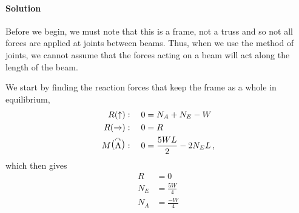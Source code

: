 \documentclass[a4paper,justified,oneside]{tufte-handout}
\numberwithin{equation}{subsection}
\begin{document}
\begin{solution}
\paragraph{Solution}
Before we begin, we must note that this is a frame, not a truss and so not all forces are applied at joints between beams. Thus, when we use the method of joints, we cannot assume that the forces acting on a beam will act along the length of the beam.

We start by finding the reaction forces that keep the frame as a whole in equilibrium,
\begin{align*}
	R(\uparrow):\quad	0	&=	N_A	+N_E	-W	\\
	R(\rightarrow):\quad	0	&=	R	\\
	M\raisebox{1.5pt}{\big(}\overset{\curvearrowright}{\text{A}}\raisebox{1.5pt}{\big)}:\quad 0	&=	\frac{5WL}{2}	-2N_E L	\,,
\end{align*}
which then gives
\begin{align*}
	R	&=	0	\\
	N_E	&=	\frac{5W}{4}	\\
	N_A	&=	\frac{-W}{4}	
\end{align*}


\end{solution}
\end{document}
